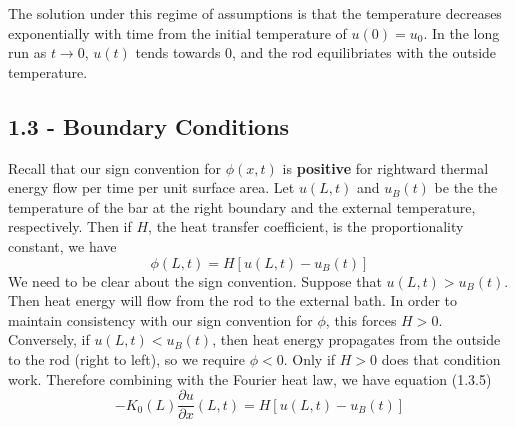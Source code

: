 \documentclass[a4paper]{article}
\begin{document}
The solution under this regime of assumptions is that the temperature decreases exponentially with time from the initial temperature of \( u \!\left( 0 \right) = u_{0} \). In the long run as \( t \rightarrow 0 \), \( u \!\left( t \right) \) tends towards 0, and the rod equilibriates with the outside temperature.

\newpage
\subsection{\textsf{1.3 - Boundary Conditions}}

Recall that our sign convention for \( \phi \!\left( x,t \right) \) is \textbf{positive} for rightward thermal energy flow per time per unit surface area. Let \( u \!\left( L,t \right) \) and \( u_{B} \!\left( t \right) \) be the the temperature of the bar at the right boundary and the external temperature, respectively. Then if \( H \), the heat transfer coefficient, is the proportionality constant, we have
\[
	\phi \!\left( L,t \right) = H \!\left[ u \!\left( L,t \right) - u_{B} \!\left( t \right) \right] 
\]
We need to be clear about the sign convention. Suppose that \( u \!\left( L,t \right) > u_{B} \!\left( t \right) \). Then heat energy will flow from the rod to the external bath. In order to maintain consistency with our sign convention for \( \phi \), this forces \( H > 0 \). Conversely, if \( u \!\left( L,t \right) < u_{B} \!\left( t \right) \), then heat energy propagates from the outside to the rod (right to left), so we require \( \phi < 0 \). Only if \( H > 0 \) does that condition work. Therefore combining with the Fourier heat law, we have equation (1.3.5)
\[
	-K_{0}\!\left( L \right)\frac{\partial u}{\partial x}\!\left( L,t \right) = H \!\left[ u \!\left( L,t \right) - u_{B}\!\left( t \right) \right] 
\]

\end{document}
